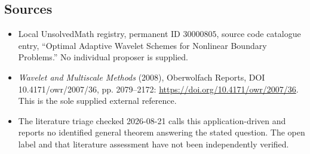 \documentclass[11pt]{article}
\begin{document}
\subsection{Sources}
\begin{itemize}
\item Local UnsolvedMath registry, permanent ID \(30000805\), source code catalogue entry, ``Optimal Adaptive Wavelet Schemes for Nonlinear Boundary Problems.'' No individual proposer is supplied.
\item \emph{Wavelet and Multiscale Methods} (2008), Oberwolfach Reports, DOI 10.4171/owr/2007/36, pp. 2079--2172: \url{https://doi.org/10.4171/owr/2007/36}. This is the sole supplied external reference.
\item The literature triage checked 2026-08-21 calls this application-driven and reports no identified general theorem answering the stated question. The open label and that literature assessment have not been independently verified.
\end{itemize}
\end{document}
